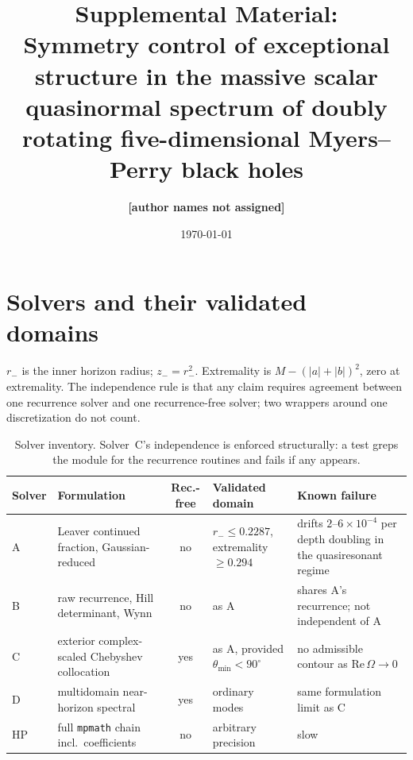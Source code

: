\documentclass[aps,prd,onecolumn,superscriptaddress,nofootinbib]{revtex4-2}
\newcommand{\TODO}[1]{\textbf{[#1]}}
\newcommand{\Rem}{\mathrm{Re}}
\begin{document}
\title{Supplemental Material:\\
Symmetry control of exceptional structure in the massive scalar quasinormal
spectrum of doubly rotating five-dimensional Myers--Perry black holes}

\author{\TODO{author names not assigned}}
\affiliation{\TODO{affiliation not assigned}}

\date{\today}
\maketitle

\section{Solvers and their validated domains}\label{sec:solvers}

$r_-$ is the inner horizon radius; $z_-=r_-^2$. Extremality is
$M-(|a|+|b|)^2$, zero at extremality. The independence rule is that any claim
requires agreement between one recurrence solver and one recurrence-free
solver; two wrappers around one discretization do not count.

\begin{table}[H]
\centering\small
\begin{tabular}{llcp{3.1cm}p{4.6cm}}
\toprule
Solver & Formulation & Rec.-free & Validated domain & Known failure \\
\midrule
A & Leaver continued fraction, Gaussian-reduced & no &
  $r_-\le0.2287$, extremality $\ge0.294$ &
  drifts $2$--$6\times10^{-4}$ per depth doubling in the quasiresonant regime \\
B & raw recurrence, Hill determinant, Wynn & no & as A &
  shares A's recurrence; not independent of A \\
C & exterior complex-scaled Chebyshev collocation & yes &
  as A, provided $\theta_{\min}<90^\circ$ &
  no admissible contour as $\Rem\,\Omega\to0$ \\
D & multidomain near-horizon spectral & yes & ordinary modes &
  same formulation limit as C \\
HP & full \texttt{mpmath} chain incl.\ coefficients & no &
  arbitrary precision & slow \\
\bottomrule
\end{tabular}
\caption{Solver inventory. Solver~C's independence is enforced structurally: a
test greps the module for the recurrence routines and fails if any appears.}
\end{table}
\end{document}
